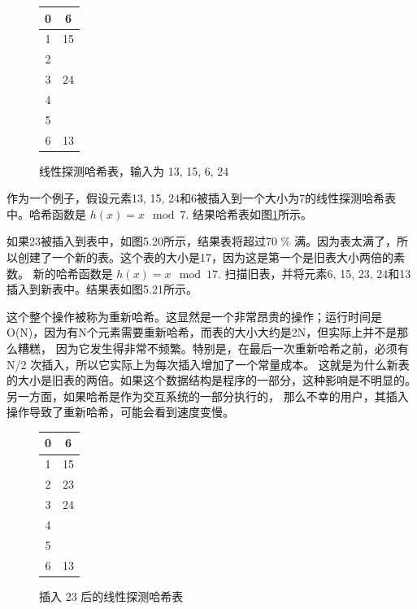 \documentclass[a4paper]{ctexart}
\theoremstyle{definition}
\theoremstyle{definition}
\begin{document}
\begin{figure}[htbp]
    \centering
    \begin{tabular}{|c|c|}
        \hline
        0 & 6 \\
        \hline
        1 & 15 \\
        \hline
        2 &  \\
        \hline
        3 & 24 \\
        \hline
        4 &  \\
        \hline
        5 &  \\
        \hline
        6 & 13 \\
        \hline
    \end{tabular}
    \caption{线性探测哈希表，输入为 13, 15, 6, 24}
    \label{fig:hash_table_1}
\end{figure}

作为一个例子，假设元素13, 15, 24和6被插入到一个大小为7的线性探测哈希表中。哈希函数是 $h(x) = x \mod 7$. 结果哈希表如图\ref{fig:hash_table_1}所示。

如果23被插入到表中，如图5.20所示，结果表将超过70 \% 满。因为表太满了，所以创建了一个新的表。这个表的大小是17，因为这是第一个是旧表大小两倍的素数。
新的哈希函数是 $h(x) = x \mod 17$. 扫描旧表，并将元素6, 15, 23, 24和13插入到新表中。结果表如图5.21所示。

这个整个操作被称为重新哈希。这显然是一个非常昂贵的操作；运行时间是O(N)，因为有N个元素需要重新哈希，而表的大小大约是2N，但实际上并不是那么糟糕，
因为它发生得非常不频繁。特别是，在最后一次重新哈希之前，必须有 N/2 次插入，所以它实际上为每次插入增加了一个常量成本。
这就是为什么新表的大小是旧表的两倍。如果这个数据结构是程序的一部分，这种影响是不明显的。另一方面，如果哈希是作为交互系统的一部分执行的，
那么不幸的用户，其插入操作导致了重新哈希，可能会看到速度变慢。

\begin{figure}[htbp]
    \centering
    \begin{tabular}{|c|c|}
        \hline
        0 & 6 \\
        \hline
        1 & 15 \\
        \hline
        2 & 23 \\
        \hline
        3 & 24 \\
        \hline
        4 &  \\
        \hline
        5 &  \\
        \hline
        6 & 13 \\
        \hline
    \end{tabular}
    \caption{插入 23 后的线性探测哈希表}
    \label{fig:hash_table_2}
\end{figure}
\end{document}
